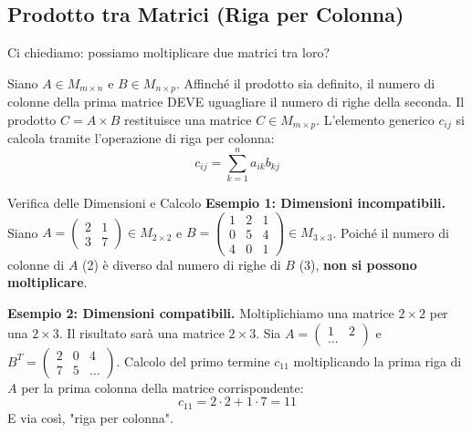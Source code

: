 \documentclass[11pt,a4paper]{article}
\begin{document}
\subsection{Prodotto tra Matrici (Riga per Colonna)}
Ci chiediamo: possiamo moltiplicare due matrici tra loro?

Siano $A \in M_{m \times n}$ e $B \in M_{n \times p}$. Affinché il prodotto sia definito, il numero di colonne della prima matrice DEVE uguagliare il numero di righe della seconda.
Il prodotto $C = A \times B$ restituisce una matrice $C \in M_{m \times p}$.
L'elemento generico $c_{ij}$ si calcola tramite l'operazione di riga per colonna:
$$ c_{ij} = \sum_{k=1}^n a_{ik} b_{kj} $$

\begin{example}{Verifica delle Dimensioni e Calcolo}{}
\textbf{Esempio 1: Dimensioni incompatibili.}
Siano $A = \begin{pmatrix} 2 & 1 \\ 3 & 7 \end{pmatrix} \in M_{2 \times 2}$ e $B = \begin{pmatrix} 1 & 2 & 1 \\ 0 & 5 & 4 \\ 4 & 0 & 1 \end{pmatrix} \in M_{3 \times 3}$. Poiché il numero di colonne di $A$ (2) è diverso dal numero di righe di $B$ (3), \textbf{non si possono moltiplicare}.

\textbf{Esempio 2: Dimensioni compatibili.}
Moltiplichiamo una matrice $2 \times 2$ per una $2 \times 3$. Il risultato sarà una matrice $2 \times 3$.
Sia $A = \begin{pmatrix} 1 & 2 \\ \dots \end{pmatrix}$ e $B^T = \begin{pmatrix} 2 & 0 & 4 \\ 7 & 5 & \dots \end{pmatrix}$.
Calcolo del primo termine $c_{11}$ moltiplicando la prima riga di $A$ per la prima colonna della matrice corrispondente:
$$ c_{11} = 2 \cdot 2 + 1 \cdot 7 = 11 $$ E via così, "riga per colonna".
\end{example}
\end{document}
